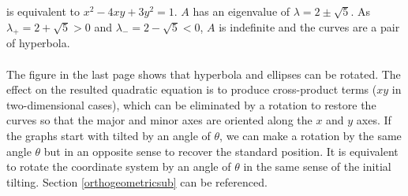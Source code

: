 is equivalent to $x^2 - 4xy + 3y^2 = 1$. $A$ has an eigenvalue of $\lambda = 2 \pm \sqrt{5}$. As $\lambda_+ = 2 + \sqrt{5} > 0$ and $\lambda_- = 2 - \sqrt{5} < 0$, $A$ is indefinite and the curves are a pair of hyperbola.\\
\\
The figure in the last page shows that hyperbola and ellipses can be rotated. The effect on the resulted quadratic equation is to produce cross-product terms ($xy$ in two-dimensional cases), which can be eliminated by a rotation to restore the curves so that the major and minor axes are oriented along the $x$ and $y$ axes. If the graphs start with tilted by an angle of $\theta$, we can make a rotation by the same angle $\theta$ but in an opposite sense to recover the standard position. It is equivalent to rotate the coordinate system by an angle of $\theta$ in the same sense of the initial tilting. Section \ref{orthogeometricsub} can be referenced.

